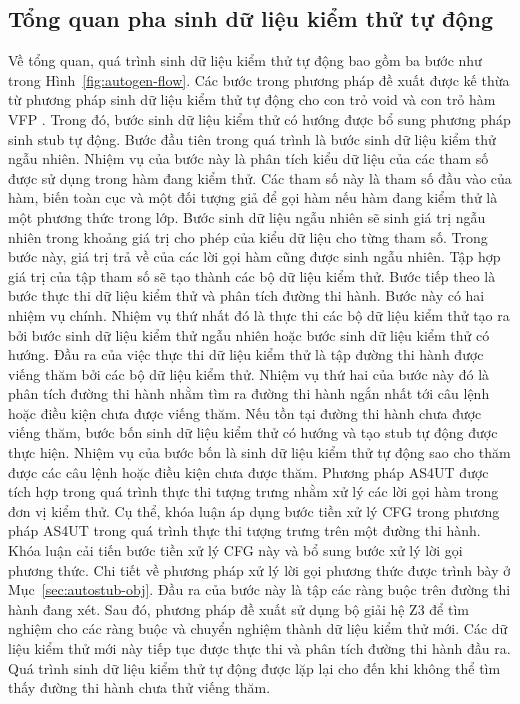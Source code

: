 \subsection{Tổng quan pha sinh dữ liệu kiểm thử tự động}
Về tổng quan, quá trình sinh dữ liệu kiểm thử tự động bao gồm ba bước như trong Hình~\autoref{fig:autogen-flow}. Các bước trong phương pháp đề xuất được kế thừa từ phương pháp sinh dữ liệu kiểm thử tự động cho con trỏ void và con trỏ hàm VFP \cite{9953784}. Trong đó, bước sinh dữ liệu kiểm thử có hướng được bổ sung phương pháp sinh stub tự động. Bước đầu tiên trong quá trình là bước sinh dữ liệu kiểm thử ngẫu nhiên. Nhiệm vụ của bước này là phân tích kiểu dữ liệu của các tham số được sử dụng trong hàm đang kiểm thử. Các tham số này là tham số đầu vào của hàm, biến toàn cục và một đối tượng giả để gọi hàm nếu hàm đang kiểm thử là một phương thức trong lớp. Bước sinh dữ liệu ngẫu nhiên sẽ sinh giá trị ngẫu nhiên trong khoảng giá trị cho phép của kiểu dữ liệu cho từng tham số. Trong bước này, giá trị trả về của các lời gọi hàm cũng được sinh ngẫu nhiên. Tập hợp giá trị của tập tham số sẽ tạo thành các bộ dữ liệu kiểm thử. Bước tiếp theo là bước thực thi dữ liệu kiểm thử và phân tích đường thi hành. Bước này có hai nhiệm vụ chính. Nhiệm vụ thứ nhất đó là thực thi các bộ dữ liệu kiểm thử tạo ra bởi bước sinh dữ liệu kiểm thử ngẫu nhiên hoặc bước sinh dữ liệu kiểm thử có hướng. Đầu ra của việc thực thi dữ liệu kiểm thử là tập đường thi hành được viếng thăm bởi các bộ dữ liệu kiểm thử. Nhiệm vụ thứ hai của bước này đó là phân tích đường thi hành nhằm tìm ra đường thi hành ngắn nhất tới câu lệnh hoặc điều kiện chưa được viếng thăm. Nếu tồn tại đường thi hành chưa được viếng thăm, bước bốn sinh dữ liệu kiểm thử có hướng và tạo stub tự động được thực hiện. Nhiệm vụ của bước bốn là sinh dữ liệu kiểm thử tự động sao cho thăm được các câu lệnh hoặc điều kiện chưa được thăm. Phương pháp AS4UT \cite{TUNG2022106821} được tích hợp trong quá trình thực thi tượng trưng nhằm xử lý các lời gọi hàm trong đơn vị kiểm thử. Cụ thể, khóa luận áp dụng bước tiền xử lý CFG trong phương pháp AS4UT trong quá trình thực thi tượng trưng trên một đường thi hành. Khóa luận cải tiến bước tiền xử lý CFG này và bổ sung bước xử lý lời gọi phương thức. Chi tiết về phương pháp xử lý lời gọi phương thức được trình bày ở Mục~\ref{sec:autostub-obj}. Đầu ra của bước này là tập các ràng buộc trên đường thi hành đang xét. Sau đó, phương pháp đề xuất sử dụng bộ giải hệ Z3 để tìm nghiệm cho các ràng buộc và chuyển nghiệm thành dữ liệu kiểm thử mới. Các dữ liệu kiểm thử mới này tiếp tục được thực thi và phân tích đường thi hành đầu ra. Quá trình sinh dữ liệu kiểm thử tự động được lặp lại cho đến khi không thể tìm thấy đường thi hành chưa thử viếng thăm.

